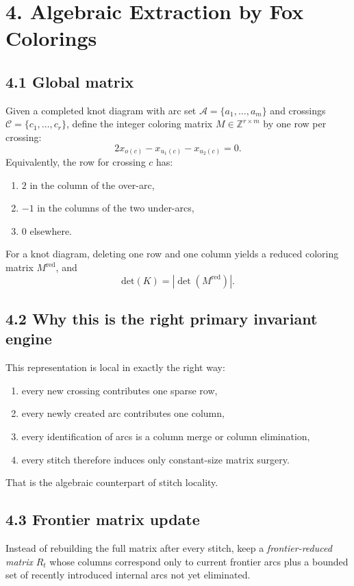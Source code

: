 \documentclass[11pt]{article}
\newcommand{\Arcs}{\mathcal{A}}
\newcommand{\Cross}{\mathcal{C}}
\newcommand{\detK}{\mathrm{det}}
\begin{document}
\section*{4. Algebraic Extraction by Fox Colorings}

\subsection*{4.1 Global matrix}
Given a completed knot diagram with arc set \(\Arcs=\{a_1,\dots,a_m\}\) and crossings \(\Cross=\{c_1,\dots,c_r\}\), define the integer coloring matrix \(M\in\mathbb{Z}^{r\times m}\) by one row per crossing:
\[
2x_{o(c)} - x_{u_1(c)} - x_{u_2(c)} = 0.
\]
Equivalently, the row for crossing \(c\) has:
\begin{enumerate}[leftmargin=1.5em,itemsep=0.2em]
    \item \(2\) in the column of the over-arc,
    \item \(-1\) in the columns of the two under-arcs,
    \item \(0\) elsewhere.
\end{enumerate}

For a knot diagram, deleting one row and one column yields a reduced coloring matrix \(M^{\mathrm{red}}\), and
\[
\detK(K)=\left|\det(M^{\mathrm{red}})\right|.
\]

\subsection*{4.2 Why this is the right primary invariant engine}
This representation is local in exactly the right way:
\begin{enumerate}[leftmargin=1.5em,itemsep=0.2em]
    \item every new crossing contributes one sparse row,
    \item every newly created arc contributes one column,
    \item every identification of arcs is a column merge or column elimination,
    \item every stitch therefore induces only constant-size matrix surgery.
\end{enumerate}

That is the algebraic counterpart of stitch locality.

\subsection*{4.3 Frontier matrix update}
Instead of rebuilding the full matrix after every stitch, keep a \emph{frontier-reduced matrix} \(R_t\) whose columns correspond only to current frontier arcs plus a bounded set of recently introduced internal arcs not yet eliminated.
\end{document}
